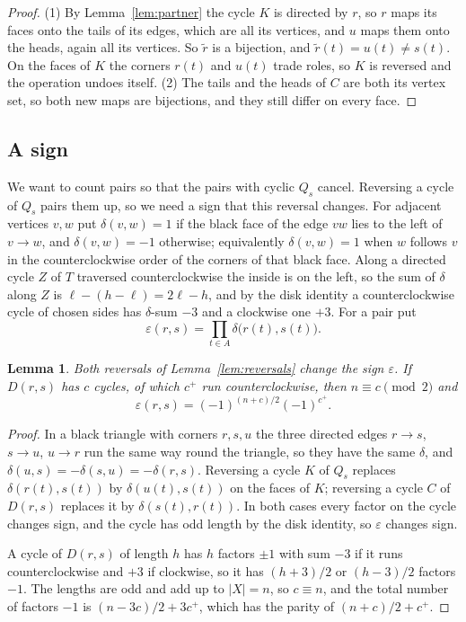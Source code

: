 \documentclass[10pt]{amsart}
\numberwithin{equation}{section}
\newtheorem{lemma}[equation]{Lemma}
\theoremstyle{definition}
\theoremstyle{remark}
\newcommand{\T}{T}
\newcommand{\eps}{\varepsilon}
\begin{document}
\begin{proof}
(1) By Lemma~\ref{lem:partner} the cycle $K$ is directed by $r$, so $r$ maps its faces onto the tails of its edges, which are all its vertices, and $u$ maps them onto the heads, again all its vertices.
So $\tilde r$ is a bijection, and $\tilde r(t)=u(t)\neq s(t)$.
On the faces of $K$ the corners $r(t)$ and $u(t)$ trade roles, so $K$ is reversed and the operation undoes itself.
(2) The tails and the heads of $C$ are both its vertex set, so both new maps are bijections, and they still differ on every face.
\end{proof}

\subsection*{A sign}
We want to count pairs so that the pairs with cyclic $Q_s$ cancel.
Reversing a cycle of $Q_s$ pairs them up, so we need a sign that this reversal changes.
For adjacent vertices $v,w$ put $\delta(v,w)=1$ if the black face of the edge $vw$ lies to the left of $v\to w$, and $\delta(v,w)=-1$ otherwise; equivalently $\delta(v,w)=1$ when $w$ follows $v$ in the counterclockwise order of the corners of that black face.
Along a directed cycle $Z$ of $\T$ traversed counterclockwise the inside is on the left, so the sum of $\delta$ along $Z$ is $\ell-(h-\ell)=2\ell-h$, and by the disk identity a counterclockwise cycle of chosen sides has $\delta$-sum $-3$ and a clockwise one $+3$.
For a pair put
\[
\eps(r,s)=\prod_{t\in A}\delta\bigl(r(t),s(t)\bigr).
\]

\begin{lemma}\label{lem:sign}
Both reversals of Lemma~\ref{lem:reversals} change the sign $\eps$.
If $D(r,s)$ has $c$ cycles, of which $c^+$ run counterclockwise, then $n\equiv c\pmod 2$ and
\[
\eps(r,s)=(-1)^{(n+c)/2}(-1)^{c^+}.
\]
\end{lemma}

\begin{proof}
In a black triangle with corners $r,s,u$ the three directed edges $r\to s$, $s\to u$, $u\to r$ run the same way round the triangle, so they have the same $\delta$, and $\delta(u,s)=-\delta(s,u)=-\delta(r,s)$.
Reversing a cycle $K$ of $Q_s$ replaces $\delta(r(t),s(t))$ by $\delta(u(t),s(t))$ on the faces of $K$; reversing a cycle $C$ of $D(r,s)$ replaces it by $\delta(s(t),r(t))$.
In both cases every factor on the cycle changes sign, and the cycle has odd length by the disk identity, so $\eps$ changes sign.

A cycle of $D(r,s)$ of length $h$ has $h$ factors $\pm1$ with sum $-3$ if it runs counterclockwise and $+3$ if clockwise, so it has $(h+3)/2$ or $(h-3)/2$ factors $-1$.
The lengths are odd and add up to $|X|=n$, so $c\equiv n$, and the total number of factors $-1$ is $(n-3c)/2+3c^+$, which has the parity of $(n+c)/2+c^+$.
\end{proof}
\end{document}

